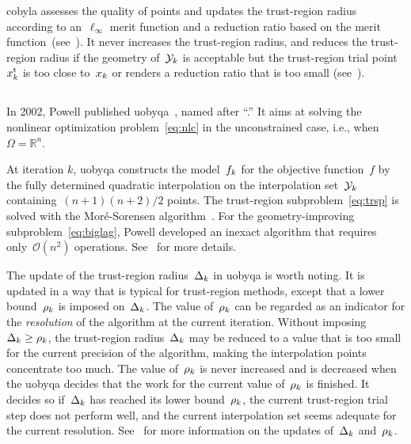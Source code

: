 \documentclass[
    smallextended,  %
    final,          %
]{svjour3}
\newcommand{\R}{\mathbb{R}}
\newcommand{\fset}{\Omega}
\newcommand{\iter}[1][k]{x\ifthenelse{\equal{#1}{}}{}{_{#1}}}
\newcommand{\objm}[1][k]{\obj\ifthenelse{\equal{#1}{}}{}{_{#1}}}
\newcommand{\obj}{f}
\newcommand{\rad}[1][k]{\Delta\ifthenelse{\equal{#1}{}}{}{_{#1}}}
\newcommand{\radlb}[1][k]{\rho\ifthenelse{\equal{#1}{}}{}{_{#1}}}
\newcommand{\trust}{{\text{t}}}
\newcommand{\xpt}[1][k]{\mathcal{Y}\ifthenelse{\equal{#1}{}}{}{_{#1}}}
\begin{document}
\gls{cobyla} assesses the quality of points and updates the trust-region radius according to
an~$\ell_\infty$ merit function and a reduction ratio based on the merit
function~(see~\cite[equations~(5),~(9), and~(10)]{Powell_1994}). It never increases
the trust-region radius, and reduces the trust-region radius if the geometry of~$\xpt$ is acceptable
but the trust-region trial point~$\iter^\trust$ is too close to~$\iter$ or renders a reduction ratio
that is too small (see~\cite[equation~(11)]{Powell_1994}).%


\subsection{}
\label{ssec:uobyqa}

In 2002, Powell published \gls{uobyqa}~\cite{Powell_2002}, named after ``.''
It aims at solving the nonlinear optimization problem~\eqref{eq:nlc} in the unconstrained case, i.e., when~$\fset = \R^n$.


At iteration $k$, \gls{uobyqa} constructs the model~$\objm$ for the objective function~$\obj$
by the fully determined quadratic interpolation on the interpolation set~$\xpt$ containing~$(n + 1)(n + 2) / 2$ points.
The trust-region subproblem~\eqref{eq:trsp} is solved with the Mor{\'{e}}-Sorensen algorithm~\cite{More_Sorensen_1983}.
For the geometry-improving subproblem~\eqref{eq:biglag}, Powell developed an inexact algorithm that requires only~$\mathcal{O}(n^2)$
operations. See~\cite[\S~2]{Powell_2002} for more details.

The update of the trust-region radius~$\rad$ in \gls{uobyqa} is worth noting.
It is updated in a way that is typical for trust-region methods, except that a  lower
bound~$\radlb$ is imposed on~$\rad$.
The value of~$\radlb[k]$ can be regarded as an indicator for the \emph{resolution} of the algorithm at the current iteration.
Without imposing~$\rad[k] \ge \radlb[k]$, the trust-region radius~$\rad[k]$ may be reduced to a
value that is too small for the current precision of the algorithm, making the interpolation points
concentrate too much.
The value of~$\radlb[k]$ is never increased and is decreased when the \gls{uobyqa} decides that the work for the current value of~$\radlb[k]$ is finished.
It decides so if~$\rad[k]$ has reached its lower bound~$\radlb[k]$,
the current trust-region trial step does not perform well,
and the current interpolation set seems adequate for the current resolution.
See~\cite[\S~3]{Powell_2002} for more information on the updates of~$\rad$ and~$\radlb[k]$.
\end{document}
